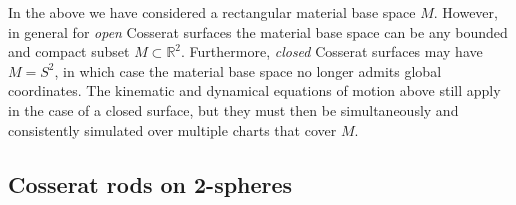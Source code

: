 In the above we have considered a rectangular material base space $M$. However, in general for \textit{open} Cosserat surfaces the material base space can be any bounded and compact subset $M \subset \mathbb{R}^2$. Furthermore, \textit{closed} Cosserat surfaces may have $M = S^2$, in which case the material base space no longer admits global coordinates. The kinematic and dynamical equations of motion above still apply in the case of a closed surface, but they must then be simultaneously and consistently simulated over multiple charts that cover $M$.










\subsection{Cosserat rods on 2-spheres} \label{sec:Cosserat rods on 2-spheres}

